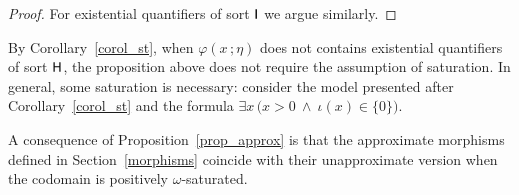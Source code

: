 \documentclass[10pt,oneside]{amsproc}
\begin{document}
\begin{proof}
For existential quantifiers of sort ${\sf I}$ we argue similarly.%
%
%
%
%
%
\end{proof}


\def\ceq#1#2#3{\parbox[t]{20ex}{$\displaystyle #1$}\parbox{5ex}{\hfil $#2$}{$\displaystyle #3$}}

  By Corollary~\ref{corol_st}, when $\varphi(x\,;\eta)$ does not contains existential quantifiers of sort ${\sf H}$, the proposition above does not require the assumption of saturation.
  In general, some saturation is necessary: consider the model presented after Corollary~\ref{corol_st} and the formula $\exists x\,\big(x>0\ \wedge\ \iota(x)\in\{0\}\big)$. 

\begin{remark}\label{rem_model_approx}
  A consequence of Proposition~\ref{prop_approx} is that the approximate morphisms defined in Section~\ref{morphisms} coincide with their unapproximate version when the codomain is positively $\omega$-saturated.
\end{remark}



\end{document}
